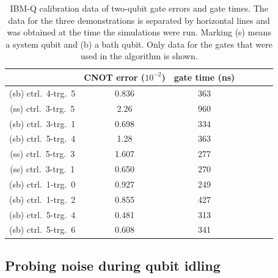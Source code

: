 \documentclass[twocolumn,amsmath,amssymb,pra]{revtex4-2}
\begin{document}
\begin{table}[ht]
\begin{tabular}{c|c|c|c|c|c|c}
                                   & CNOT error ($10^{-2}$) & gate time (ns)  \\
\hline
(sb)    ctrl.~4-trg.~5 & 0.836                    & 363                 \\
\hline
(ss)    ctrl.~3-trg.~5 & 2.26                     & 960                 \\
(sb)    ctrl.~3-trg.~1 & 0.698                    & 334                 \\
(sb)    ctrl.~5-trg.~4 & 1.28                     & 363                 \\
\hline
(ss)    ctrl.~5-trg.~3 & 1.607                    & 277                 \\
(ss)    ctrl.~3-trg.~1 & 0.650                    & 270                 \\
(sb)    ctrl.~1-trg.~0 & 0.927                    & 249                 \\
(sb)    ctrl.~1-trg.~2 & 0.855                    & 427                 \\
(sb)    ctrl.~5-trg.~4 & 0.481                    & 313                 \\
(sb)    ctrl.~5-trg.~6 & 0.608                    & 341                 \\
\hline
\end{tabular}
\centering
\caption{
IBM-Q calibration data of two-qubit gate errors and gate times.
The data for the three demonstrations is separated by horizontal lines and was obtained at the time the simulations were run.
Marking (s) means a system qubit and (b) a bath qubit.
Only data for the gates that were used in the algorithm is shown.
}
\label{tab:calibtration_data2}
\end{table}

\subsection{Probing noise during qubit idling}\label{sec:noise_idling}
\end{document}
